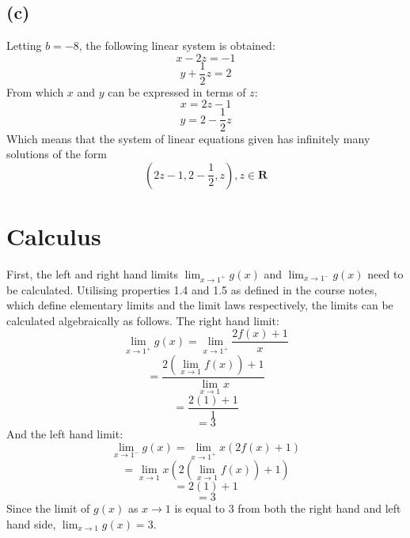 \documentclass[11pt]{article}
\begin{document}
\subsection*{(c)}
Letting $b=-8$, the following linear system is obtained:
$$x-2z=-1$$
$$y+\frac{1}{2}z=2$$
From which $x$ and $y$ can be expressed in terms of $z$:
$$x=2z-1$$
$$y=2-\frac{1}{2}z$$
Which means that the system of linear equations given has infinitely many solutions of the form
$$(2z-1,2-\frac{1}{2}, z),z \in \mathbf{R}$$
\section*{Calculus}
First, the left and right hand limits $\lim_{x\to 1^+}g(x)$ and $\lim_{x\to 1^-}g(x)$ need to be calculated. Utilising properties 1.4 and 1.5 as defined in the course notes, which define elementary limits and the limit laws respectively, the limits can be calculated algebraically as follows. The right hand limit:
$$\lim_{x\to 1^+}g(x)=\lim_{x\to 1^+}\frac{2f(x)+1}{x} $$ 
$$ =\frac{2(\lim_{x\to 1}f(x))+1}{\lim_{x\to 1}x} $$ 
$$ =\frac{2(1)+1}{1}$$
$$ =3$$
And the left hand limit:
$$\lim_{x\to 1^-}g(x)=\lim_{x\to 1^+}x(2f(x)+1)$$ 
$$ =\lim_{x\to 1}x(2(\lim_{x\to 1}f(x))+1)$$ 
$$ =2(1)+1$$
$$ =3$$
Since the limit of $g(x)$ as $x\to 1$ is equal to $3$ from both the right hand and left hand side, $\lim_{x\to 1}g(x)=3$.
\end{document}
